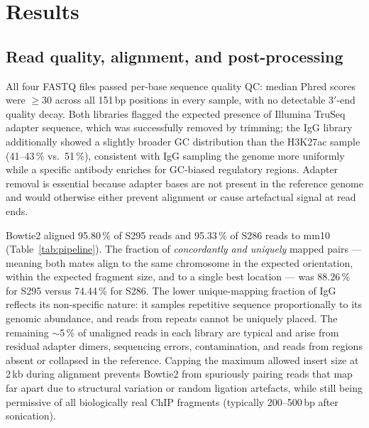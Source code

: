 \documentclass[11pt,a4paper]{article}
\begin{document}
\section*{Results}

\subsection*{Read quality, alignment, and post-processing}
All four FASTQ files passed per-base sequence quality QC: median Phred scores were $\geq$30 across all 151\,bp positions in every sample, with no detectable 3$'$-end quality decay. Both libraries flagged the expected presence of Illumina TruSeq adapter sequence, which was successfully removed by trimming; the IgG library additionally showed a slightly broader GC distribution than the H3K27ac sample (41--43\,\% vs.\ 51\,\%), consistent with IgG sampling the genome more uniformly while a specific antibody enriches for GC-biased regulatory regions. Adapter removal is essential because adapter bases are not present in the reference genome and would otherwise either prevent alignment or cause artefactual signal at read ends.

Bowtie2 aligned 95.80\,\% of S295 reads and 95.33\,\% of S286 reads to mm10 (Table~\ref{tab:pipeline}). The fraction of \emph{concordantly and uniquely} mapped pairs — meaning both mates align to the same chromosome in the expected orientation, within the expected fragment size, and to a single best location — was 88.26\,\% for S295 versus 74.44\,\% for S286. The lower unique-mapping fraction of IgG reflects its non-specific nature: it samples repetitive sequence proportionally to its genomic abundance, and reads from repeats cannot be uniquely placed. The remaining $\sim$5\,\% of unaligned reads in each library are typical and arise from residual adapter dimers, sequencing errors, contamination, and reads from regions absent or collapsed in the reference. Capping the maximum allowed insert size at 2\,kb during alignment prevents Bowtie2 from spuriously pairing reads that map far apart due to structural variation or random ligation artefacts, while still being permissive of all biologically real ChIP fragments (typically 200--500\,bp after sonication).
\end{document}
